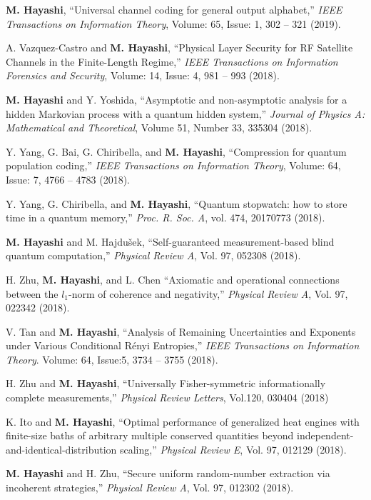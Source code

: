 \documentclass[a4paper,12pt,oneside]{article}
\begin{document}
\begin{enumerate}
\textbf{M. Hayashi},
``Universal channel coding for general output alphabet,'' 
{\em IEEE Transactions on Information Theory},
Volume: 65, Issue: 1, 302 -- 321 (2019). 

A. Vazquez-Castro and \textbf{M. Hayashi},
``Physical Layer Security for RF Satellite Channels in the Finite-Length Regime,'' 
{\em IEEE Transactions on Information Forensics and Security},
Volume: 14, Issue: 4,  981 -- 993 (2018).

\textbf{M. Hayashi} and Y. Yoshida,
``Asymptotic and non-asymptotic analysis for a hidden Markovian process with a quantum hidden system,''
{\em Journal of Physics A: Mathematical and Theoretical}, 
Volume 51, Number 33, 335304 (2018).

Y. Yang, G. Bai, G. Chiribella, and \textbf{M. Hayashi}, 
``Compression for quantum population coding,''
{\em IEEE Transactions on Information Theory},
Volume: 64, Issue: 7, 4766 -- 4783 (2018). 

Y. Yang, G. Chiribella, and
\textbf{M. Hayashi},
``Quantum stopwatch: how to store time in a quantum memory,''
{\em Proc. R. Soc. A}, vol. 474, 20170773 (2018).

\textbf{M. Hayashi} and M. Hajdu\v{s}ek,
``Self-guaranteed measurement-based blind quantum computation,'' 
{\em Physical Review A}, Vol. 97, 052308 (2018).

H. Zhu, \textbf{M. Hayashi}, and L. Chen
``Axiomatic and operational connections between the $l_1$-norm of coherence and negativity,''
{\em Physical Review A}, Vol. 97, 022342 (2018).

V. Tan and \textbf{M. Hayashi},
``Analysis of Remaining Uncertainties and Exponents under Various Conditional R\'{e}nyi Entropies,''
{\em IEEE Transactions on Information Theory}.
Volume: 64, Issue:5, 3734 -- 3755 (2018). 

H. Zhu and \textbf{M. Hayashi},
``Universally Fisher-symmetric informationally complete measurements,''
{\em Physical Review Letters}, Vol.120, 030404 (2018)

K. Ito and \textbf{M. Hayashi},
``Optimal performance of generalized heat engines with finite-size baths
of arbitrary multiple conserved quantities beyond independent-and-identical-distribution scaling,''
{\em Physical Review E}, Vol. 97, 012129 (2018).

\textbf{M. Hayashi} and H. Zhu,
``Secure uniform random-number extraction via incoherent strategies,''
{\em Physical Review A}, Vol. 97, 012302 (2018).


\end{enumerate}
\end{document}
